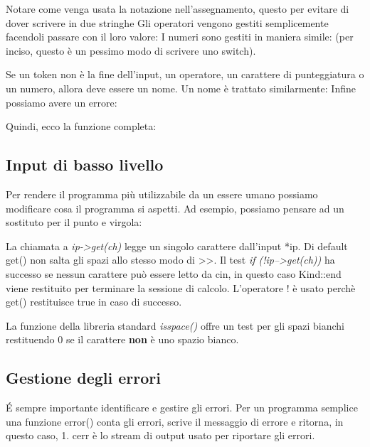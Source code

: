 \documentclass[11pt,a4paper]{book}
\begin{document}
Notare come venga usata la notazione {} nell'assegnamento, questo per evitare di dover scrivere in due stringhe
\label{code: 135}
Gli operatori vengono gestiti semplicemente facendoli passare con il loro valore:
\label{code: 136}
I numeri sono gestiti in maniera simile:
\label{code: 137}
(per inciso, questo è un pessimo modo di scrivere uno switch).

Se un token non è la fine dell'input, un operatore, un carattere di punteggiatura o un numero, allora deve essere un nome. Un nome è trattato similarmente:
\label{code: 138}
Infine possiamo avere un errore:
\label{code: 139}

Quindi, ecco la funzione completa:
\label{code: 140}

\subsection{Input di basso livello}
Per rendere il programma più utilizzabile da un essere umano possiamo modificare cosa il programma si aspetti. Ad esempio, possiamo pensare ad un sostituto per il punto e virgola:
\label{code: 141}

La chiamata a \emph{ip->get(ch)} legge un singolo carattere dall'input *ip. Di default get() non salta gli spazi allo stesso modo di >>. Il test \emph{if (!ip–>get(ch))} ha successo se nessun carattere può essere letto da cin, in questo caso Kind::end viene restituito per terminare la sessione di calcolo. L'operatore ! è usato perchè get() restituisce true in caso di successo.

La funzione della libreria standard \emph{isspace()} offre un test per gli spazi bianchi restituendo 0 se il carattere \textbf{non} è uno spazio bianco. 

\subsection{Gestione degli errori}
É sempre importante identificare e gestire gli errori. Per un programma semplice una funzione error() conta gli errori, scrive il messaggio di errore e ritorna, in questo caso, 1.
\label{code: 142}
cerr è lo stream di output usato per riportare gli errori.
\end{document}
